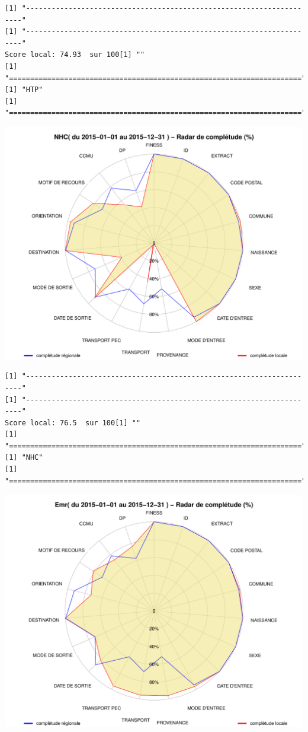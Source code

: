 \documentclass[]{article}
\begin{document}
\begin{verbatim}
[1] "---------------------------------------------------------------------"
[1] "---------------------------------------------------------------------"
Score local: 74.93  sur 100[1] ""
[1] "====================================================================="
[1] "HTP"
[1] "====================================================================="
\end{verbatim}

\includegraphics{completude_files/figure-latex/finess-16.pdf}

\begin{verbatim}
[1] "---------------------------------------------------------------------"
[1] "---------------------------------------------------------------------"
Score local: 76.5  sur 100[1] ""
[1] "====================================================================="
[1] "NHC"
[1] "====================================================================="
\end{verbatim}

\includegraphics{completude_files/figure-latex/finess-17.pdf}
\end{document}
